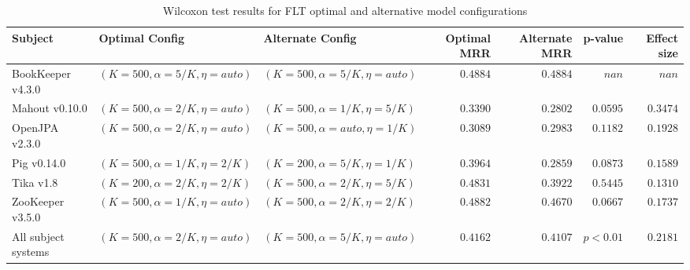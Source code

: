 \begin{landscape}

\begin{table}
\begin{spacing}{1.2}
\centering
\caption{Wilcoxon test results for FLT optimal and alternative model configurations}
\label{table:combo-flt-model-sweep-wilcox}
\begin{tabular}{lllrrrr}
\toprule
                      Subject &                    Optimal Config &                  Alternate Config & Optimal MRR & Alternate MRR &  p-value & Effect size \\
\midrule
            BookKeeper v4.3.0 &  $(K=500, \alpha=5/K, \eta=auto)$ &  $(K=500, \alpha=5/K, \eta=auto)$ &    $0.4884$ &      $0.4884$ &    $nan$ &       $nan$ \\
               Mahout v0.10.0 &  $(K=500, \alpha=2/K, \eta=auto)$ &   $(K=500, \alpha=1/K, \eta=5/K)$ &    $0.3390$ &      $0.2802$ & $0.0595$ &    $0.3474$ \\
               OpenJPA v2.3.0 &  $(K=500, \alpha=2/K, \eta=auto)$ &  $(K=500, \alpha=auto, \eta=1/K)$ &    $0.3089$ &      $0.2983$ & $0.1182$ &    $0.1928$ \\
                  Pig v0.14.0 &   $(K=500, \alpha=1/K, \eta=2/K)$ &   $(K=200, \alpha=5/K, \eta=1/K)$ &    $0.3964$ &      $0.2859$ & $0.0873$ &    $0.1589$ \\
                    Tika v1.8 &   $(K=200, \alpha=2/K, \eta=2/K)$ &   $(K=500, \alpha=2/K, \eta=5/K)$ &    $0.4831$ &      $0.3922$ & $0.5445$ &    $0.1310$ \\
             ZooKeeper v3.5.0 &  $(K=500, \alpha=1/K, \eta=auto)$ &   $(K=500, \alpha=2/K, \eta=2/K)$ &    $0.4882$ &      $0.4670$ & $0.0667$ &    $0.1737$ \\
 \midrule
All subject systems &  $(K=500, \alpha=2/K, \eta=auto)$ &  $(K=500, \alpha=5/K, \eta=auto)$ &    $0.4162$ &      $0.4107$ & $p<0.01$ &    $0.2181$ \\
\bottomrule
\end{tabular}

\end{spacing}
\end{table}



\end{landscape}
